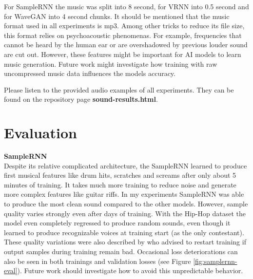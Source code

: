 \documentclass[12pt]{article}
\begin{document}
For SampleRNN the music was split into 8 second, for VRNN into 0.5 second and for WaveGAN into 4 second chunks.
It should be mentioned that the music format used in all experiments is mp3.
Among other tricks to reduce its file size, this format relies on psychoacoustic phenomenas.
For example, frequencies that cannot be heard by the human ear or are overshadowed by previous louder sound are cut out.
However, these features might be important for AI models to learn music generation.
Future work might investigate how training with raw uncompressed music data influences the models accuracy.


Please listen to the provided audio examples of all experiments.
They can be found on the repository page \textbf{sound-results.html}.




\section{Evaluation}
\textbf{SampleRNN}\\
Despite its relative complicated architecture, the SampleRNN learned to produce first musical features like drum hits, scratches and screams after only about 5 minutes of training.
It takes much more training to reduce noise and generate more complex features like guitar riffs.
In my experiments SampleRNN was able to produce the most clean sound compared to the other models.
However, sample quality varies strongly even after days of training.
With the Hip-Hop dataset the model even completely regressed to produce random sounds, even though it learned to produce recognizable voices at training start (as the only contestant).
These quality variations were also described by \cite{carr2018generating} who advised to restart training if output samples during training remain bad.
Occasional loss deteriorations can also be seen in both trainings and validation losses (see Figure \ref{fig:samplernn-eval}).
Future work should investigate how to avoid this unpredictable behavior.
\end{document}
